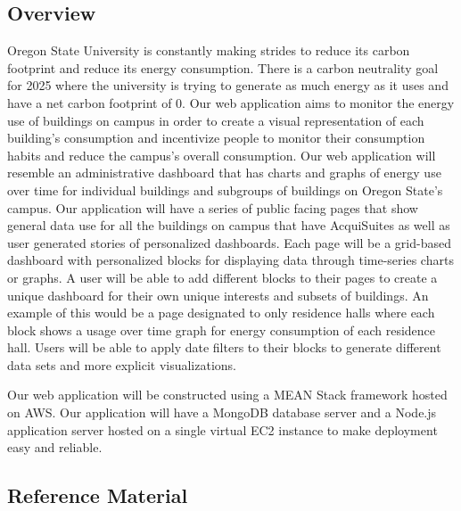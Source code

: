 \documentclass[journal,10pt,onecolumn,compsoc]{IEEEtran}
\begin{document}
    \subsection{Overview}
    Oregon State University is constantly making strides to reduce its carbon footprint and reduce its energy consumption. There is a carbon neutrality goal for 2025 where the university is trying to generate as much energy as it uses and have a net carbon footprint of 0. Our web application aims to monitor the energy use of buildings on campus in order to create a visual representation of each building's consumption and incentivize people to monitor their consumption habits and reduce the campus's overall consumption.
    \noindent Our web application will resemble an administrative dashboard that has charts and graphs of energy use over time for individual buildings and subgroups of buildings on Oregon State's campus. 
    Our application will have a series of public facing pages that show general data use for all the buildings on campus that have AcquiSuites as well as user generated stories of personalized dashboards. Each page will be a grid-based dashboard with personalized blocks for displaying data through time-series charts or graphs. A user will be able to add different blocks to their pages to create a unique dashboard for their own unique interests and subsets of buildings. An example of this would be a page designated to only residence halls where each block shows a usage over time graph for energy consumption of each residence hall. Users will be able to apply date filters to their blocks to generate different data sets and more explicit visualizations.

    \noindent Our web application will be constructed using a MEAN Stack framework hosted on AWS. Our application will have a MongoDB database server and a Node.js application server hosted on a single virtual EC2 instance to make deployment easy and reliable.
   
    \subsection{Reference Material}
\end{document}

